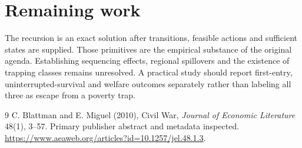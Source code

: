 \documentclass[11pt]{article}
\begin{document}
\section*{Remaining work}
The recursion is an exact solution after transitions, feasible actions and sufficient states are supplied. Those primitives are the empirical substance of the original agenda. Establishing sequencing effects, regional spillovers and the existence of trapping classes remains unresolved. A practical study should report first-entry, uninterrupted-survival and welfare outcomes separately rather than labeling all three as escape from a poverty trap.
\begin{thebibliography}{9}
 C. Blattman and E. Miguel (2010), Civil War, \emph{Journal of Economic Literature} 48(1), 3--57. Primary publisher abstract and metadata inspected. \url{https://www.aeaweb.org/articles?id=10.1257/jel.48.1.3}.
\end{thebibliography}
\end{document}
